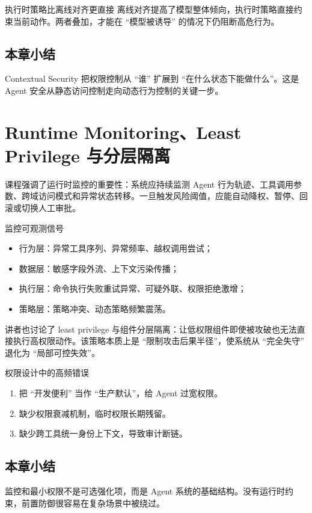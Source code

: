 \documentclass[a4paper]{article}
\begin{document}
\begin{importantbox}{执行时策略比离线对齐更直接}
离线对齐提高了模型整体倾向，执行时策略直接约束当前动作。两者叠加，才能在 ``模型被诱导'' 的情况下仍阻断高危行为。
\end{importantbox}

\subsection{本章小结}
Contextual Security 把权限控制从 ``谁'' 扩展到 ``在什么状态下能做什么''。这是 Agent 安全从静态访问控制走向动态行为控制的关键一步。

\section{Runtime Monitoring、Least Privilege 与分层隔离}

课程强调了运行时监控的重要性：系统应持续监测 Agent 行为轨迹、工具调用参数、跨域访问模式和异常状态转移。一旦触发风险阈值，应能自动降权、暂停、回滚或切换人工审批。

\begin{knowledgebox}{监控可观测信号}
\begin{itemize}
    \item 行为层：异常工具序列、异常频率、越权调用尝试；
    \item 数据层：敏感字段外流、上下文污染传播；
    \item 执行层：命令执行失败重试异常、可疑外联、权限拒绝激增；
    \item 策略层：策略冲突、动态策略频繁震荡。
\end{itemize}
\end{knowledgebox}

讲者也讨论了 least privilege 与组件分层隔离：让低权限组件即使被攻破也无法直接执行高权限动作。该策略本质上是 ``限制攻击后果半径''，使系统从 ``完全失守'' 退化为 ``局部可控失效''。

\begin{warningbox}{权限设计中的高频错误}
\begin{enumerate}
    \item 把 ``开发便利'' 当作 ``生产默认''，给 Agent 过宽权限。
    \item 缺少权限衰减机制，临时权限长期残留。
    \item 缺少跨工具统一身份上下文，导致审计断链。
\end{enumerate}
\end{warningbox}

\subsection{本章小结}
监控和最小权限不是可选强化项，而是 Agent 系统的基础结构。没有运行时约束，前置防御很容易在复杂场景中被绕过。
\end{document}
